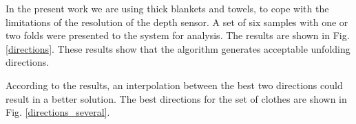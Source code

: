 In the present work we are using thick blankets and towels, to cope with the limitations of the resolution of the depth sensor. A set of six samples with one or two folds were presented to the system for analysis. The results are shown in Fig. \ref{directions}.
%
These results show that the algorithm generates acceptable unfolding directions.


According to the results, an interpolation between the best two directions could result in a better solution. The best directions for the set of clothes are shown in Fig. \ref{directions_several}. %


